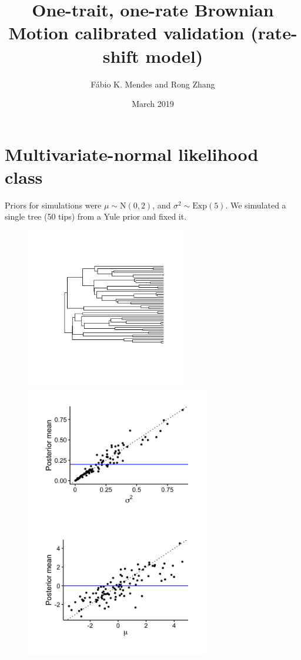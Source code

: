 \documentclass{article}
\title{One-trait, one-rate Brownian Motion calibrated validation
  (rate-shift model)}
\author{F\'{a}bio K. Mendes and Rong Zhang}
\date{March 2019}
\begin{document}
\maketitle

\newpage

\section{Multivariate-normal likelihood class}

Priors for simulations were $\mu \sim \text{N}(0, 2)$, and $\sigma^2 \sim \text{Exp}(5)$. We simulated a single tree (50 tips) from a Yule prior and fixed it.

\begin{figure}[!ht]
  \begin{minipage}[c]{.4\textwidth}
    \centering
    \includegraphics[width=7cm]{../BMMVNShiftOneRate_ultra_tree.png}
  \end{minipage}
  \hfill
  \begin{minipage}{.5\textwidth}
    \centering
    \includegraphics[width=8cm]{../BMMVNShiftOneRate_ultra_graphs.png}
  \end{minipage}
\end{figure}
\end{document}
